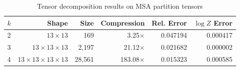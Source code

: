 \begin{table}[htbp]
\centering
\caption{Tensor decomposition results on MSA partition tensors}
\begin{tabular}{lrrrrr}
\hline
$k$ & Shape & Size & Compression & Rel. Error & $\log Z$ Error \\
\hline
2 & $13\times13$ & 169 & 3.25$\times$ & 0.047194 & 0.000417 \\
3 & $13\times13\times13$ & 2,197 & 21.12$\times$ & 0.021682 & 0.000002 \\
4 & $13\times13\times13\times13$ & 28,561 & 183.08$\times$ & 0.015323 & 0.000585 \\
\hline
\end{tabular}
\end{table}
